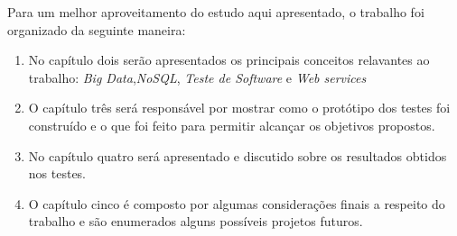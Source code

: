 Para um melhor aproveitamento do estudo aqui apresentado, o trabalho foi organizado da seguinte maneira:

\begin{enumerate}

\item No capítulo dois serão apresentados os principais conceitos relavantes ao trabalho: \textit{Big Data},\textit{NoSQL}, \textit{Teste de Software} e \textit{Web services}

\item O capítulo três será responsável por mostrar como o protótipo dos testes foi construído e o que foi feito para permitir alcançar os objetivos propostos.

\item No capítulo quatro será apresentado e discutido sobre os resultados obtidos nos testes.

\item O capítulo cinco é composto por algumas considerações finais a respeito do trabalho e são enumerados alguns possíveis projetos futuros.

\end{enumerate}

